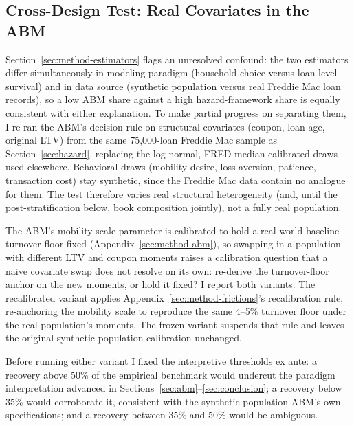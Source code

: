 \documentclass[12pt]{article}
\begin{document}
\subsection{Cross-Design Test: Real Covariates in the ABM}\label{sec:robustness-crossdesign}

Section~\ref{sec:method-estimators} flags an unresolved confound: the two estimators differ simultaneously in modeling paradigm (household choice versus loan-level survival) and in data source (synthetic population versus real Freddie Mac loan records), so a low ABM share against a high hazard-framework share is equally consistent with either explanation. To make partial progress on separating them, I re-ran the ABM's decision rule on structural covariates (coupon, loan age, original LTV) from the same 75,000-loan Freddie Mac sample as Section~\ref{sec:hazard}, replacing the log-normal, FRED-median-calibrated draws used elsewhere. Behavioral draws (mobility desire, loss aversion, patience, transaction cost) stay synthetic, since the Freddie Mac data contain no analogue for them. The test therefore varies real structural heterogeneity (and, until the post-stratification below, book composition jointly), not a fully real population.

The ABM's mobility-scale parameter is calibrated to hold a real-world baseline turnover floor fixed (Appendix~\ref{sec:method-abm}), so swapping in a population with different LTV and coupon moments raises a calibration question that a naive covariate swap does not resolve on its own: re-derive the turnover-floor anchor on the new moments, or hold it fixed? I report both variants. The recalibrated variant applies Appendix~\ref{sec:method-frictions}'s recalibration rule, re-anchoring the mobility scale to reproduce the same 4--5\% turnover floor under the real population's moments. The frozen variant suspends that rule and leaves the original synthetic-population calibration unchanged.

Before running either variant I fixed the interpretive thresholds ex ante: a recovery above 50\% of the empirical benchmark would undercut the paradigm interpretation advanced in Sections~\ref{sec:abm}--\ref{sec:conclusion}; a recovery below 35\% would corroborate it, consistent with the synthetic-population ABM's own specifications; and a recovery between 35\% and 50\% would be ambiguous.
\end{document}
